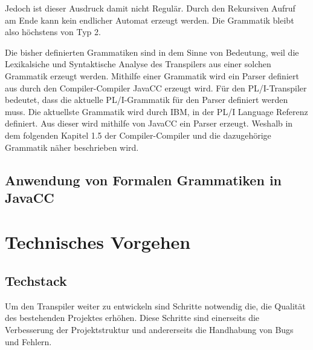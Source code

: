 Jedoch ist dieser Ausdruck damit nicht Regulär. Durch den Rekursiven Aufruf am Ende kann kein endlicher Automat erzeugt werden. Die Grammatik bleibt also höchstens von Typ 2.

	
Die bisher definierten Grammatiken sind in dem Sinne von Bedeutung, weil die Lexikalsiche und Syntaktische Analyse des Transpilers aus einer solchen Grammatik erzeugt werden. Mithilfe einer Grammatik wird ein Parser definiert aus durch den Compiler-Compiler JavaCC erzeugt wird. 
Für den PL/I-Transpiler bedeutet, dass die aktuelle PL/I-Grammatik für den Parser definiert werden muss. Die aktuellste Grammatik wird durch IBM, in der PL/I Language Referenz definiert. Aus dieser wird mithilfe von JavaCC ein Parser erzeugt. Weshalb in dem folgenden Kapitel 1.5 der Compiler-Compiler und die dazugehörige Grammatik näher beschrieben wird.

     
\subsection{Anwendung von Formalen Grammatiken in JavaCC}
  


\section{Technisches Vorgehen}
\subsection{Techstack}
Um den Transpiler weiter zu entwickeln sind Schritte notwendig die, die Qualität des bestehenden Projektes erhöhen. Diese Schritte sind einerseits die Verbesserung der Projektstruktur und andererseits die Handhabung von Bugs und Fehlern.

